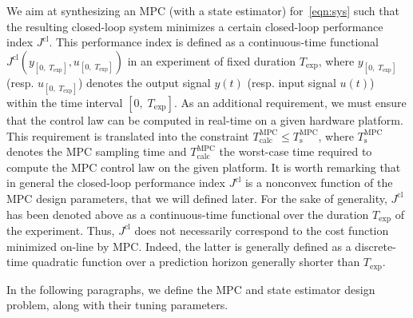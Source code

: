 \documentclass{article}
\newcommand{\Texp}{T_{\mathrm{exp}}}
\newcommand{\TMPC}{T_{\mathrm{s}}^{\mathrm{MPC}}}
\newcommand{\TCALCMPC}{T_{\mathrm{calc}}^{\mathrm{MPC}}}
\newcommand{\Ts}{T_{\mathrm{s}}}
\newcommand{\JC}{{J^\mathrm{cl}}}
\newtheorem{remark}{Remark}{\normalfont}{\normalfont}
\newcommand{\DP}[1]{\textbf{\color{red}{[DP: #1]}}}
\newcommand{\MF}[1]{\textbf{\color{blue}{[MF: #1]}}}
\begin{document}
We aim at synthesizing an MPC  (with a state estimator) for~\eqref{eqn:sys}  such that the resulting closed-loop system minimizes a certain closed-loop performance index $\JC$. This performance index is defined as a continuous-time functional $\JC(y_{[0,\;\Texp]}, u_{[0,\;\Texp]})$ in  an experiment of fixed duration  $\Texp$, where $y_{[0,\;\Texp]}$ (resp. $u_{[0,\;\Texp]}$) denotes the output signal $y(t)$ (resp. input signal $u(t)$) within the time interval $[0,\;\Texp]$.  
%
% 
As an additional requirement, we must ensure that the control law can be computed in real-time on a given hardware platform. This requirement is translated into the constraint $\TCALCMPC \leq \TMPC$, where $\TMPC$ denotes the MPC sampling time  and $\TCALCMPC$ the worst-case time required to compute the MPC control law on the given platform. %
It is worth remarking that in general the closed-loop performance index $\JC$ is a nonconvex function of the MPC design parameters, that we will defined later. For the sake of generality, $\JC$ has been denoted above as a continuous-time functional over the duration $\Texp$ of the experiment. Thus, $\JC$ does not necessarily correspond to the cost function minimized on-line by MPC. Indeed, the latter is generally defined as a discrete-time quadratic function over a prediction horizon generally shorter than $\Texp$. 

In the following paragraphs, we define the MPC and state estimator design problem, 
along with their tuning parameters. 
\end{document}
